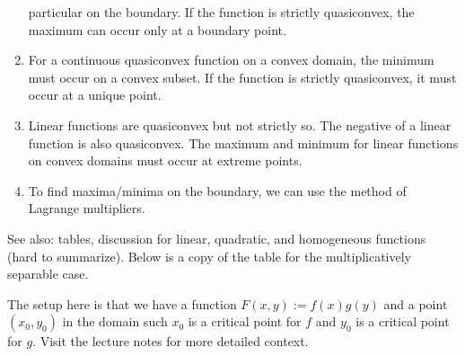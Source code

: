 \documentclass[10pt]{amsart}
\begin{document}
\begin{enumerate}
  particular on the boundary. If the function is strictly quasiconvex,
  the maximum can occur only at a boundary point.
\item For a continuous quasiconvex function on a convex domain, the
  minimum must occur on a convex subset. If the function is strictly
  quasiconvex, it must occur at a unique point.
\item Linear functions are quasiconvex but not strictly so. The
  negative of a linear function is also quasiconvex. The maximum and
  minimum for linear functions on convex domains must occur at extreme
  points.
\item To find maxima/minima on the boundary, we can use the method of
  Lagrange multipliers.
\end{enumerate}

See also: tables, discussion for linear, quadratic, and homogeneous
functions (hard to summarize). Below is a copy of the table for the
multiplicatively separable case.

The setup here is that we have a function $F(x,y) := f(x)g(y)$ and a
point $(x_0,y_0)$ in the domain such $x_0$ is a critical point for $f$
and $y_0$ is a critical point for $g$. Visit the lecture notes for
more detailed context.
\end{document}
